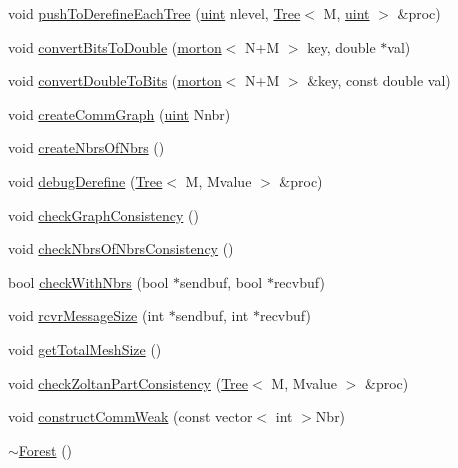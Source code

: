 \begin{DoxyCompactItemize}
\item 
void \mbox{\hyperlink{classForest_a9d98b98639826d2b1f4ea740879b6f53}{push\+To\+Derefine\+Each\+Tree}} (\mbox{\hyperlink{definitions_8h_a69aa29b598b851b0640aa225a9e5d61d}{uint}} nlevel, \mbox{\hyperlink{classTree}{Tree}}$<$ M, \mbox{\hyperlink{definitions_8h_a69aa29b598b851b0640aa225a9e5d61d}{uint}} $>$ \&proc)
\item 
void \mbox{\hyperlink{classForest_a37b60e74ca7bb1cdf4ecbb9cc693ce63}{convert\+Bits\+To\+Double}} (\mbox{\hyperlink{definitions_8h_af8682350bd8bb38ee9023f7a0a310add}{morton}}$<$ N+M $>$ key, double $\ast$val)
\item 
void \mbox{\hyperlink{classForest_a6648461dfcb06501a61872e34a350769}{convert\+Double\+To\+Bits}} (\mbox{\hyperlink{definitions_8h_af8682350bd8bb38ee9023f7a0a310add}{morton}}$<$ N+M $>$ \&key, const double val)
\item 
void \mbox{\hyperlink{classForest_a6a12247ec2f9ae36f657c2abf63b9364}{create\+Comm\+Graph}} (\mbox{\hyperlink{definitions_8h_a69aa29b598b851b0640aa225a9e5d61d}{uint}} Nnbr)
\item 
void \mbox{\hyperlink{classForest_ac27f3fb712096592183fd7abf331bfbd}{create\+Nbrs\+Of\+Nbrs}} ()
\item 
void \mbox{\hyperlink{classForest_a39d07ba859ced552613ddc78e690d197}{debug\+Derefine}} (\mbox{\hyperlink{classTree}{Tree}}$<$ M, Mvalue $>$ \&proc)
\item 
void \mbox{\hyperlink{classForest_a04578eeef2e9b141213a72460beba78d}{check\+Graph\+Consistency}} ()
\item 
void \mbox{\hyperlink{classForest_ac3d632acc8f403d10ca83f0c6afd88af}{check\+Nbrs\+Of\+Nbrs\+Consistency}} ()
\item 
bool \mbox{\hyperlink{classForest_a1f73446b3ae9457f2fafe44045eee589}{check\+With\+Nbrs}} (bool $\ast$sendbuf, bool $\ast$recvbuf)
\item 
void \mbox{\hyperlink{classForest_aaffbfa6fb511fd1f0fd0ac7d7f95e9a2}{rcvr\+Message\+Size}} (int $\ast$sendbuf, int $\ast$recvbuf)
\item 
void \mbox{\hyperlink{classForest_a08ab89f83fa5282e39221d69b1cb5fbe}{get\+Total\+Mesh\+Size}} ()
\item 
void \mbox{\hyperlink{classForest_a9d43ef1507b68218e54909d9d473d168}{check\+Zoltan\+Part\+Consistency}} (\mbox{\hyperlink{classTree}{Tree}}$<$ M, Mvalue $>$ \&proc)
\item 
void \mbox{\hyperlink{classForest_a6bbe4fa1ffa7fbc96fdbca3b98dcb690}{construct\+Comm\+Weak}} (const vector$<$ int $>$Nbr)
\item 
\mbox{\hyperlink{classForest_a08e4f9b19871f0acf49b5b2f4a321f26}{$\sim$\+Forest}} ()
\end{DoxyCompactItemize}
